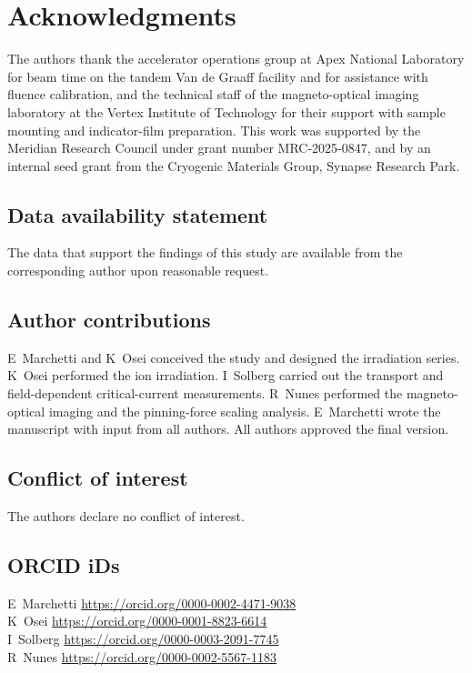 \section*{Acknowledgments}
\label{sec:ack}
The authors thank the accelerator operations group at Apex National Laboratory for beam time on the tandem Van de Graaff facility and for assistance with fluence calibration, and the technical staff of the magneto-optical imaging laboratory at the Vertex Institute of Technology for their support with sample mounting and indicator-film preparation. This work was supported by the Meridian Research Council under grant number MRC-2025-0847, and by an internal seed grant from the Cryogenic Materials Group, Synapse Research Park.

\subsection*{Data availability statement}
The data that support the findings of this study are available from the corresponding author upon reasonable request.

\subsection*{Author contributions}
E~Marchetti and K~Osei conceived the study and designed the irradiation series. K~Osei performed the ion irradiation. I~Solberg carried out the transport and field-dependent critical-current measurements. R~Nunes performed the magneto-optical imaging and the pinning-force scaling analysis. E~Marchetti wrote the manuscript with input from all authors. All authors approved the final version.

\subsection*{Conflict of interest}
The authors declare no conflict of interest.

\subsection*{ORCID iDs}
{\small
\noindent E~Marchetti \url{https://orcid.org/0000-0002-4471-9038}\\
K~Osei \url{https://orcid.org/0000-0001-8823-6614}\\
I~Solberg \url{https://orcid.org/0000-0003-2091-7745}\\
R~Nunes \url{https://orcid.org/0000-0002-5567-1183}
}
